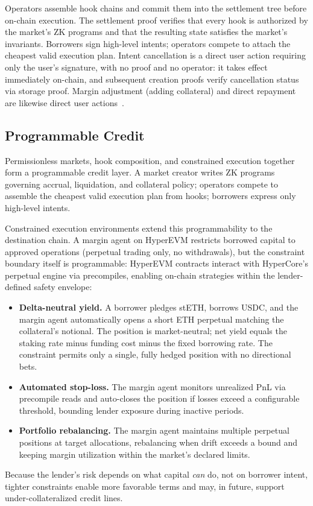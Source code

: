 Operators assemble hook chains and commit them into the settlement tree before on-chain execution. The settlement proof verifies that every hook is authorized by the market's ZK programs and that the resulting state satisfies the market's invariants. Borrowers sign high-level intents; operators compete to attach the cheapest valid execution plan. Intent cancellation is a direct user action requiring only the user's signature, with no proof and no operator: it takes effect immediately on-chain, and subsequent creation proofs verify cancellation status via storage proof. Margin adjustment (adding collateral) and direct repayment are likewise direct user actions~\cite{daloc-decent2026}.

\subsection{Programmable Credit}

Permissionless markets, hook composition, and constrained execution together form a programmable credit layer. A market creator writes ZK programs governing accrual, liquidation, and collateral policy; operators compete to assemble the cheapest valid execution plan from hooks; borrowers express only high-level intents.

Constrained execution environments extend this programmability to the destination chain. A margin agent on HyperEVM restricts borrowed capital to approved operations (perpetual trading only, no withdrawals), but the constraint boundary itself is programmable: HyperEVM contracts interact with HyperCore's perpetual engine via precompiles, enabling on-chain strategies within the lender-defined safety envelope:
\begin{itemize}
  \item \textbf{Delta-neutral yield.} A borrower pledges stETH, borrows USDC, and the margin agent automatically opens a short ETH perpetual matching the collateral's notional. The position is market-neutral; net yield equals the staking rate minus funding cost minus the \daloc{} fixed borrowing rate. The constraint permits only a single, fully hedged position with no directional bets.
  \item \textbf{Automated stop-loss.} The margin agent monitors unrealized PnL via precompile reads and auto-closes the position if losses exceed a configurable threshold, bounding lender exposure during inactive periods.
  \item \textbf{Portfolio rebalancing.} The margin agent maintains multiple perpetual positions at target allocations, rebalancing when drift exceeds a bound and keeping margin utilization within the market's declared limits.
\end{itemize}
Because the lender's risk depends on what capital \emph{can} do, not on borrower intent, tighter constraints enable more favorable terms and may, in future, support under-collateralized credit lines.

